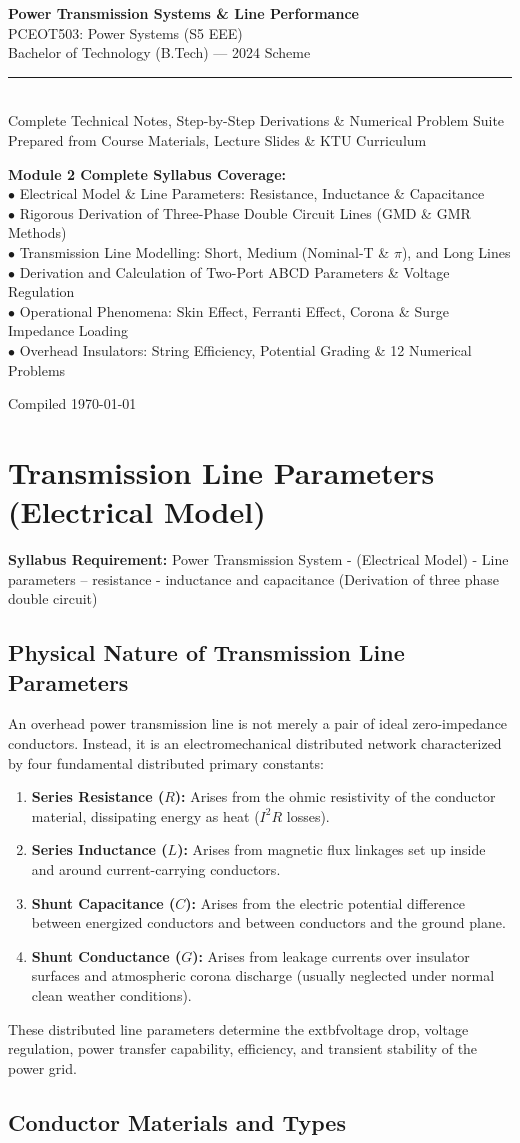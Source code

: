 \documentclass[11pt,a4paper]{article}
\newcommand{\docsubject}{PCEOT503: Power Systems (S5 EEE)}
\newcommand{\doctitle}{Power Transmission Systems \& Line Performance}
\newcommand{\syllabusitem}[1]{%
  \begin{tcolorbox}[enhanced, colback=AnthOrange!8, colframe=AnthOrange, boxrule=0.4pt, arc=3pt, left=7pt, right=7pt, top=3pt, bottom=3pt]
    \small\sffamily\textbf{\color{AnthOrange}Syllabus Requirement:} #1
  \end{tcolorbox}
}
\newcommand{\maketitlepage}{%
  \begin{titlepage}
    \pagecolor{AnthDark}
    \color{AnthLight}
    \vspace*{2.2cm}
    \begin{center}
      {\huge\bfseries\sffamily \doctitle}\\[0.8em]
      {\Large\sffamily\color{AnthOrange} \docsubject}\\[0.4em]
      {\large\sffamily\color{AnthMidGray} Bachelor of Technology (B.Tech) — 2024 Scheme}\\[2.0em]
      \color{AnthOrange}\rule{0.5\textwidth}{1.2pt}\\[1.8em]
      {\normalsize\sffamily\color{AnthLightGray} Complete Technical Notes, Step-by-Step Derivations \& Numerical Problem Suite}\\[0.4em]
      {\small\sffamily\color{AnthMidGray} Prepared from Course Materials, Lecture Slides \& KTU Curriculum}\\[2.8em]
      \begin{tcolorbox}[enhanced, width=0.84\textwidth, colback=AnthDark!90, colframe=AnthOrange!60, arc=4pt, boxrule=0.6pt]
        \centering\small\sffamily\color{AnthLight}
        \textbf{Module 2 Complete Syllabus Coverage:}\\[3pt]
        $\bullet$ Electrical Model \& Line Parameters: Resistance, Inductance \& Capacitance\\
        $\bullet$ Rigorous Derivation of Three-Phase Double Circuit Lines (GMD \& GMR Methods)\\
        $\bullet$ Transmission Line Modelling: Short, Medium (Nominal-T \& $\pi$), and Long Lines\\
        $\bullet$ Derivation and Calculation of Two-Port ABCD Parameters \& Voltage Regulation\\
        $\bullet$ Operational Phenomena: Skin Effect, Ferranti Effect, Corona \& Surge Impedance Loading\\
        $\bullet$ Overhead Insulators: String Efficiency, Potential Grading \& 12 Numerical Problems
      \end{tcolorbox}
      \vfill
      {\small\sffamily\color{AnthMidGray} Compiled \today}
    \end{center}
    \vspace*{0.8cm}
  \end{titlepage}
  \pagecolor{AnthLight}
  \color{AnthDark}
}
\begin{document}
\maketitlepage

\thispagestyle{empty}
{
  \hypersetup{hidelinks}
  \tableofcontents
}
\clearpage

\section{Transmission Line Parameters (Electrical Model)}

\syllabusitem{Power Transmission System - (Electrical Model) - Line parameters – resistance - inductance and capacitance (Derivation of three phase double circuit)}

\subsection{Physical Nature of Transmission Line Parameters}

An overhead power transmission line is not merely a pair of ideal zero-impedance conductors. Instead, it is an electromechanical distributed network characterized by four fundamental distributed primary constants:
\begin{enumerate}
  \item \textbf{Series Resistance ($R$):} Arises from the ohmic resistivity of the conductor material, dissipating energy as heat ($I^2 R$ losses).
  \item \textbf{Series Inductance ($L$):} Arises from magnetic flux linkages set up inside and around current-carrying conductors.
  \item \textbf{Shunt Capacitance ($C$):} Arises from the electric potential difference between energized conductors and between conductors and the ground plane.
  \item \textbf{Shunt Conductance ($G$):} Arises from leakage currents over insulator surfaces and atmospheric corona discharge (usually neglected under normal clean weather conditions).
\end{enumerate}

These distributed line parameters determine the 	extbf{voltage drop, voltage regulation, power transfer capability, efficiency, and transient stability} of the power grid.

\subsection{Conductor Materials and Types}
\end{document}
